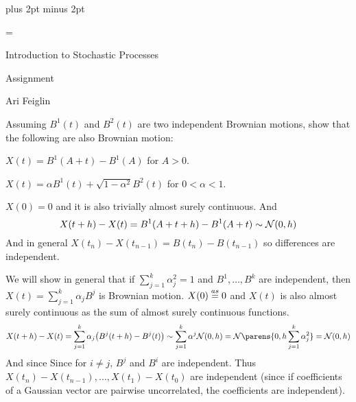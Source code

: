 

\parindent=0cm
\parskip=3pt plus 2pt minus 2pt





\footline={}

\def\printmcount{\the\counter{section}.\the\counter{math counter}}
\setcounter{section}{8}


{

    \centerline{Introduction to Stochastic Processes}
    \smallskip
    \centerline{Assignment \the{}}
    \centerline{Ari Feiglin}

\eppbox}

\bigskip

\bexerc

    Assuming $B^1(t)$ and $B^2(t)$ are two independent Brownian motions, show that the following are also Brownian motion:
    \benum
        \item $X(t)=B^1(A+t)-B^1(A)$ for $A>0$.
        \item $X(t)=\alpha B^1(t) + \sqrt{1-\alpha^2}B^2(t)$ for $0<\alpha<1$.
    \eenum

\eexerc

\benum
    \item $X(0)=0$ and it is also trivially almost surely continuous.
    And
    $$ X(t+h) - X(t) = B^1(A+t+h) - B^1(A+t) \sim {\cal N}(0,h) $$
    And in general $X(t_n)-X(t_{n-1})=B(t_n)-B(t_{n-1})$ so differences are independent.
    \item We will show in general that if $\sum_{j=1}^k\alpha_j^2=1$ and $B^1,\dots,B^k$ are independent, then $X(t)=\sum_{j=1}^k\alpha_jB^j$ is Brownian motion.
    $X(0)\buildrel as\over=0$ and $X(t)$ is also almost surely continuous as the sum of almost surely continuous functions.
    $$ X(t+h) - X(t) = \sum_{j=1}^k\alpha_j\bigl(B^j(t+h) - B^j(t)\bigr) \sim \sum_{j=1}^k \alpha^j{\cal N}(0,h) = {\cal N}\parens{0,h\sum_{j=1}^k\alpha_j^2} = {\cal N}(0,h) $$
    And since
    Since for $i\neq j$, $B^j$ and $B^i$ are independent.
    Thus $X(t_n)-X(t_{n-1}),\dots,X(t_1)-X(t_0)$ are independent (since if coefficients of a Gaussian vector are pairwise uncorrelated, the coefficients are independent).
\eenum

